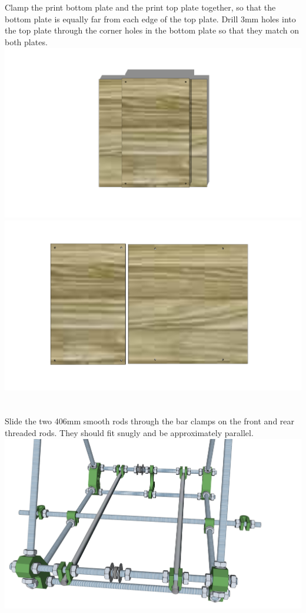 \documentclass[twoside,openany,a4paper,titlepage]{memoir}
\begin{document}
	\section{}
	Clamp the print bottom plate and the print top plate together, so that the bottom plate is equally far from
	each edge of the top plate. Drill 3mm holes into the top plate through the corner holes in the bottom
	plate so that they match on both plates.\\
	\includegraphics[width=1\linewidth]{graphics/ch6_3_1.png}
	\includegraphics[width=1\linewidth]{graphics/ch6_3_2.png}
	
	\section{}
	Slide the two 406mm smooth rods through the bar clamps on the front and rear threaded rods. They
	should fit snugly and be approximately parallel.\\
	\includegraphics[width=1\linewidth]{graphics/ch6_4.png}
	
\end{document}
